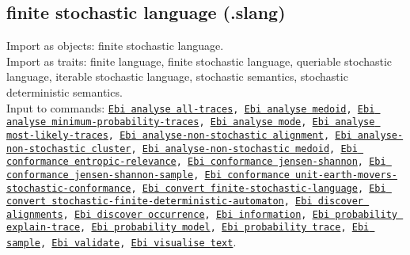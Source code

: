 {\subsection{finite stochastic language (.slang)}
Import as objects: finite stochastic language.
\\Import as traits: finite language, finite stochastic language, queriable stochastic language, iterable stochastic language, stochastic semantics, stochastic deterministic semantics.
\\Input to commands: \texttt{\hyperref[command:Ebi analyse all-traces]{Ebi analyse all-traces}, \hyperref[command:Ebi analyse medoid]{Ebi analyse medoid}, \hyperref[command:Ebi analyse minimum-probability-traces]{Ebi analyse minimum-probability-traces}, \hyperref[command:Ebi analyse mode]{Ebi analyse mode}, \hyperref[command:Ebi analyse most-likely-traces]{Ebi analyse most-likely-traces}, \hyperref[command:Ebi analyse-non-stochastic alignment]{Ebi analyse-non-stochastic alignment}, \hyperref[command:Ebi analyse-non-stochastic cluster]{Ebi analyse-non-stochastic cluster}, \hyperref[command:Ebi analyse-non-stochastic medoid]{Ebi analyse-non-stochastic medoid}, \hyperref[command:Ebi conformance entropic-relevance]{Ebi conformance entropic-relevance}, \hyperref[command:Ebi conformance jensen-shannon]{Ebi conformance jensen-shannon}, \hyperref[command:Ebi conformance jensen-shannon-sample]{Ebi conformance jensen-shannon-sample}, \hyperref[command:Ebi conformance unit-earth-movers-stochastic-conformance]{Ebi conformance unit-earth-movers-stochastic-conformance}, \hyperref[command:Ebi convert finite-stochastic-language]{Ebi convert finite-stochastic-language}, \hyperref[command:Ebi convert stochastic-finite-deterministic-automaton]{Ebi convert stochastic-finite-deterministic-automaton}, \hyperref[command:Ebi discover alignments]{Ebi discover alignments}, \hyperref[command:Ebi discover occurrence]{Ebi discover occurrence}, \hyperref[command:Ebi information]{Ebi information}, \hyperref[command:Ebi probability explain-trace]{Ebi probability explain-trace}, \hyperref[command:Ebi probability model]{Ebi probability model}, \hyperref[command:Ebi probability trace]{Ebi probability trace}, \hyperref[command:Ebi sample]{Ebi sample}, \hyperref[command:Ebi validate]{Ebi validate}, \hyperref[command:Ebi visualise text]{Ebi visualise text}}.
}
